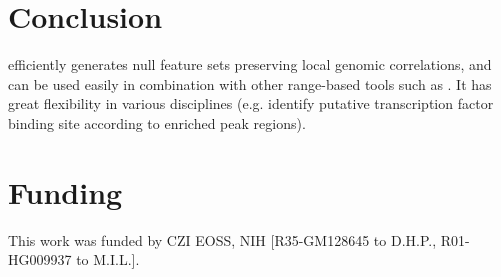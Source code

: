 \vspace*{-20pt}
\section{Conclusion}

\bootranges efficiently generates null feature sets preserving 
local genomic correlations, and can be used easily in combination with
other range-based tools such as \plyranges.
It has great flexibility in various disciplines (e.g. identify
putative transcription factor binding site according to enriched peak
regions).


\vspace*{-20pt}

\section*{Funding}
This work was funded by CZI EOSS, NIH [R35-GM128645 to D.H.P., R01-HG009937 to M.I.L.]. 

\vspace*{-20pt}
